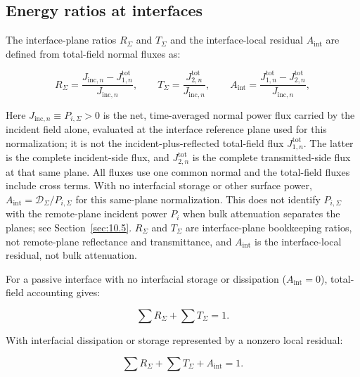 

\subsection{Energy ratios at interfaces}
\label{sec:9.7}

The interface-plane ratios $R_{\Sigma}$ and $T_{\Sigma}$ and the interface-local residual $A_{\mathrm{int}}$ are defined from total-field normal fluxes as:

\begin{equation}
R_{\Sigma} = \frac{J_{\mathrm{inc},n}-J_{1,n}^{\mathrm{tot}}}{J_{\mathrm{inc},n}},
\qquad
T_{\Sigma} = \frac{J_{2,n}^{\mathrm{tot}}}{J_{\mathrm{inc},n}},
\qquad
A_{\mathrm{int}} = \frac{J_{1,n}^{\mathrm{tot}}-J_{2,n}^{\mathrm{tot}}}{J_{\mathrm{inc},n}},
\label{eq:9.10}
\end{equation}

Here $J_{\mathrm{inc},n}\equiv P_{i,\Sigma}>0$ is the net, time-averaged normal power flux carried by the incident field alone, evaluated at the interface reference plane used for this normalization; it is not the incident-plus-reflected total-field flux $J_{1,n}^{\mathrm{tot}}$. The latter is the complete incident-side flux, and $J_{2,n}^{\mathrm{tot}}$ is the complete transmitted-side flux at that same plane. All fluxes use one common normal and the total-field fluxes include cross terms. With no interfacial storage or other surface power, $A_{\mathrm{int}}=\mathcal{D}_{\Sigma}/P_{i,\Sigma}$ for this same-plane normalization. This does not identify $P_{i,\Sigma}$ with the remote-plane incident power $P_i$ when bulk attenuation separates the planes; see Section~\ref{sec:10.5}. $R_{\Sigma}$ and $T_{\Sigma}$ are interface-plane bookkeeping ratios, not remote-plane reflectance and transmittance, and $A_{\mathrm{int}}$ is the interface-local residual, not bulk attenuation.

For a passive interface with no interfacial storage or dissipation ($A_{\mathrm{int}}=0$), total-field accounting gives:

\begin{equation}
\sum R_{\Sigma} + \sum T_{\Sigma} = 1.
\label{eq:9.11}
\end{equation}

With interfacial dissipation or storage represented by a nonzero local residual:

\begin{equation}
\sum R_{\Sigma} + \sum T_{\Sigma} + A_{\mathrm{int}} = 1.
\label{eq:9.12}
\end{equation}

